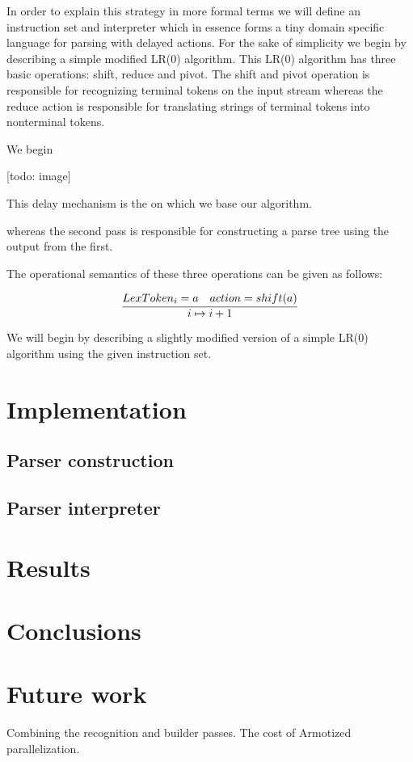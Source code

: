 \documentclass[11pt]{article}
\begin{document}
In order to explain this strategy in more formal terms we will define an instruction set and interpreter which in essence forms a tiny domain specific language for parsing with delayed actions.
For the sake of simplicity we begin by describing a simple modified LR(0) algorithm. This LR(0) algorithm has three basic operations: shift, reduce and pivot. 
The shift and pivot operation is responsible for recognizing terminal tokens on the input stream whereas the reduce action is responsible for translating strings of terminal tokens into nonterminal tokens.

We begin



[todo: image]

This delay mechanism is the on which we base our algorithm.


 whereas the second pass is responsible for constructing a parse tree using the output from the first.

The operational semantics of these three operations can be given as follows:



\[
\infer{i \mapsto i+1}{LexToken_i = a & action = shift(a)}
\]


We will begin by describing a slightly modified version of a simple LR(0) algorithm using the given instruction set.


\section{Implementation}
\subsection{Parser construction}
\subsection{Parser interpreter}

\section*{Results}

\section*{Conclusions}

\section*{Future work}

Combining the recognition and builder passes.
The cost of Armotized parallelization.
\end{document}
